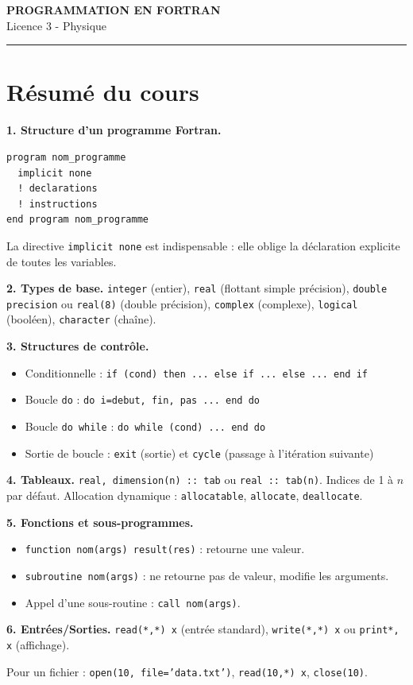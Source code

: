\documentclass[12pt,a4paper]{article}
\begin{document}
\fi

\begin{center}
  {\LARGE\bfseries PROGRAMMATION EN FORTRAN}\\[0.3cm]
  {\normalsize Licence 3 - Physique}\\[0.1cm]
  \rule{0.7\textwidth}{0.8pt}
\end{center}

\section*{Résumé du cours}

\begin{boiteresume}

\textbf{1. Structure d'un programme Fortran.}
\begin{lstlisting}
program nom_programme
  implicit none
  ! declarations
  ! instructions
end program nom_programme
\end{lstlisting}
La directive \texttt{implicit none} est indispensable : elle oblige la déclaration explicite de toutes les variables.

\textbf{2. Types de base.} \texttt{integer} (entier), \texttt{real} (flottant simple précision), \texttt{double precision} ou \texttt{real(8)} (double précision), \texttt{complex} (complexe), \texttt{logical} (booléen), \texttt{character} (chaîne).

\textbf{3. Structures de contrôle.}
\begin{itemize}[nosep]
  \item Conditionnelle : \texttt{if (cond) then ... else if ... else ... end if}
  \item Boucle \texttt{do} : \texttt{do i=debut, fin, pas ... end do}
  \item Boucle \texttt{do while} : \texttt{do while (cond) ... end do}
  \item Sortie de boucle : \texttt{exit} (sortie) et \texttt{cycle} (passage à l'itération suivante)
\end{itemize}

\textbf{4. Tableaux.} \texttt{real, dimension(n) :: tab} ou \texttt{real :: tab(n)}. Indices de 1 à $n$ par défaut. Allocation dynamique : \texttt{allocatable}, \texttt{allocate}, \texttt{deallocate}.

\textbf{5. Fonctions et sous-programmes.}
\begin{itemize}[nosep]
  \item \texttt{function nom(args) result(res)} : retourne une valeur.
  \item \texttt{subroutine nom(args)} : ne retourne pas de valeur, modifie les arguments.
  \item Appel d'une sous-routine : \texttt{call nom(args)}.
\end{itemize}

\textbf{6. Entrées/Sorties.} \texttt{read(*,*) x} (entrée standard), \texttt{write(*,*) x} ou \texttt{print*, x} (affichage).

Pour un fichier : \texttt{open(10, file='data.txt')}, \texttt{read(10,*) x}, \texttt{close(10)}.

\end{boiteresume}
\end{document}
